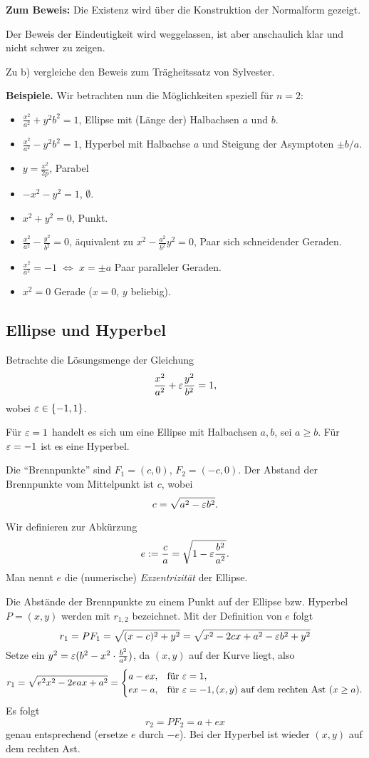 \documentclass[
 a4paper,
 12pt,
 parskip=half
 ]{scrartcl}
\theoremstyle{plain}
\theoremstyle{definition}
\begin{document}
\textbf{Zum Beweis:}  Die Existenz wird über die Konstruktion der Normalform gezeigt.

Der Beweis der Eindeutigkeit wird weggelassen, ist aber anschaulich klar und nicht schwer zu
zeigen.

Zu b) vergleiche den Beweis zum Trägheitssatz von Sylvester.

\bigskip

\textbf{Beispiele.}
Wir betrachten nun die Möglichkeiten speziell für $n=2$:
\begin{itemize}
  \item $\frac{x^2}{a^2}+{y^2}{b^2} = 1$, Ellipse mit (Länge der) Halbachsen $a$ und $b$.
  \item $\frac{x^2}{a^2} - {y^2}{b^2} = 1$, Hyperbel mit Halbachse $a$ und Steigung der Asymptoten $\pm b/a$.
  \item $y = \frac{x^2}{2p}$, Parabel
  \item $-x^2 - y^2 = 1$, $\emptyset$.
  \item $x^2 + y^2 = 0$, Punkt.
  \item $\frac{x^2}{a^2} - \frac{y^2}{b^2} = 0$, äquivalent zu $x^2 -
      \frac{a^2}{b^2} y^2 = 0$, Paar sich schneidender Geraden.
  \item $\frac{x^2}{a^2} = -1$ $\Leftrightarrow$ $x = \pm a$ Paar paralleler
    Geraden.
  \item $x^2 = 0$ Gerade ($x=0$, $y$ beliebig).
\end{itemize}

\subsection{Ellipse und Hyperbel}
Betrachte die Lösungsmenge der Gleichung
\[ \frac{x^2}{a^2} + \varepsilon \frac{y^2}{b^2} = 1, \]
wobei $\varepsilon \in \{ -1, 1 \}$.

Für $\varepsilon = 1$ handelt es sich um eine Ellipse mit Halbachsen $a,b$, sei $a \ge
b$. Für $\varepsilon = -1$ ist es eine Hyperbel.

Die ``Brennpunkte'' sind $F_1 = (c,0)$, $F_2 = (-c, 0)$. Der Abstand der
Brennpunkte vom Mittelpunkt ist $c$, wobei
\[ c = \sqrt{a^2 - \varepsilon b^2}. \]

Wir definieren zur Abkürzung
\[ e := \frac{c}{a} = \sqrt{1 - \varepsilon \frac{b^2}{a^2}}. \]
Man nennt $e$ die (numerische) \emph{Exzentrizität} der Ellipse.

Die Abstände der Brennpunkte zu einem Punkt auf der Ellipse bzw. Hyperbel
$P = (x,y)$ werden mit $r_{1,2}$ bezeichnet. Mit der Definition von $e$ folgt
\[ r_1 = PF_1 = \sqrt{(x-c)^2 + y^2} = \sqrt{x^2 - 2cx + a^2 - \varepsilon b^2 +
    y^2} \]
Setze ein $y^2 = \varepsilon( b^2 - x^2 \cdot \frac{b^2}{a^2})$, da $(x,y)$ auf der
Kurve liegt, also
\[ r_1 = \sqrt{e^2 x^2 - 2 eax + a^2} =
  \begin{cases}
    a - ex, &\text{für } \varepsilon = 1, \\
    ex - a, &\text{für } \varepsilon = -1, (x,y) \text{ auf dem rechten Ast }(x \ge a).
  \end{cases} \]
Es folgt
\[ r_2 = PF_2 = a + ex\]
genau entsprechend (ersetze $e$ durch $-e$). Bei der Hyperbel ist wieder $(x,y)$
auf dem rechten Ast.
\end{document}
